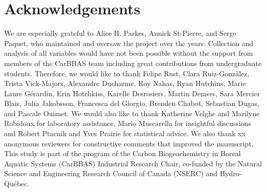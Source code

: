 \documentclass[12pt,a4paper]{article} %
\begin{document}
\section*{Acknowledgements}
We are especially grateful to Alice H. Parkes, Annick St-Pierre, and Serge Paquet, who maintained and oversaw the project over the years. Collection and analysis of all variables would have not been possible without the support from members of the CarBBAS team including great contributions from undergraduate students. Therefore, we would like to thank Felipe Rust, Clara Ruiz-Gonz\`{a}lez, Trista Vick-Majors, Alexandre Ducharme, Roy Nahas, Ryan Hutchins, Marie Laure G\'{e}rardin,  Erin Hotchkiss, Karelle Desrosiers, Martin Demers, Sara Mercier Blais, Julia Jakobsson, Francesca del Giorgio, Brenden Chabot, Sebastian Dugas, and Pascale Ouimet. We would also like to thank Katherine Velghe and Marilyne Robidoux for laboratory assistance, Mario Muscarella for insightful discussions and Robert Ptacnik and Yves Prairie for statistical advice. We also thank xx anonymous reviewers for constructive comments that improved the manuscript. This study is part of the program of the Carbon Biogeochemistry in Boreal Aquatic Systems (CarBBAS) Industrial Research Chair, co-funded by the Natural Science and Engineering Research Council of Canada (NSERC) and Hydro-Qu\'{e}bec.

\newpage
\singlespacing



\newpage
\end{document}
